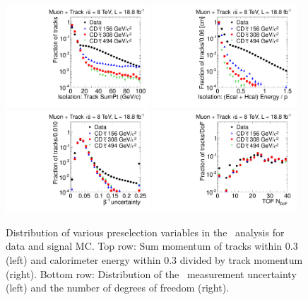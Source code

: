 \begin{figure}
\centering
  \includegraphics[clip=false, trim=0.0cm 0cm 0.0cm 0cm, width=0.48\textwidth]{figures/tkmu/Selection_Comp_8TeV_GMStau_IsolT_BS}
  \includegraphics[clip=false, trim=0.0cm 0cm 0.0cm 0cm, width=0.48\textwidth]{figures/tkmu/Selection_Comp_8TeV_GMStau_IsolE_BS} \\
  \includegraphics[clip=false, trim=0.0cm 0cm 0.0cm 0cm, width=0.48\textwidth]{figures/tkmu/Selection_Comp_8TeV_GMStau_TOFError_BS}
  \includegraphics[clip=false, trim=0.0cm 0cm 0.0cm 0cm, width=0.48\textwidth]{figures/tkmu/Selection_Comp_8TeV_GMStau_nDof_BS}
  \caption[Distribution of tracker and calorimeter isolation as well as the \invbeta\ measurement number of degrees of freedom and uncertainty
in the \tktof\ analysis for data and signal MC.]
{Distribution of various preselection variables in the \tktof\ analysis for data and signal MC.
Top row: Sum momentum of tracks within 0.3 (left) and calorimeter energy within 0.3 divided by track momentum (right).
Bottom row: Distribution of the \invbeta\ measurement uncertainty (left) and the number of degrees of freedom (right).}
    \label{fig:TkMuPreselC}
\end{figure}

